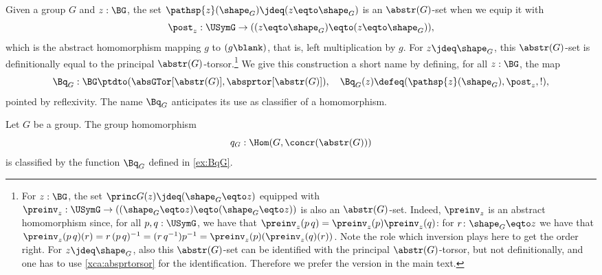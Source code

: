 \begin{example}\label{ex:BqG} 
  Given a group $G$ and $z:\BG$, 
  the set $\pathsp{z}(\sh_G)\jdeq (z\eqto\sh_G)$
  is an $\abstr(G)$-set when we equip it with
  $$\post_z:\USymG\to ((z\eqto\sh_G)\eqto (z\eqto\sh_G)),$$
  which is the abstract homomorphism mapping $g$ to $(g\blank)$,
  that is, left multiplication by $g$.
  For $z\jdeq\sh_G$, this $\abstr(G)$-set is definitionally equal
  to the principal $\abstr(G)$-torsor.\footnote{\label{ft:shG=z}%
  For $z:\BG$,
  the set $\princ G(z)\jdeq (\sh_G\eqto z)$ equipped with
  $\preinv_z:\USymG\to ((\sh_G\eqto z)\eqto (\sh_G\eqto z))$
  is also an $\abstr(G)$-set.
  Indeed, $\preinv_z$ is an abstract homomorphism since,
  for all $p,q:\USymG$, we have that 
  $\preinv_z(p\,q)=\preinv_z(p)\preinv_z(q)$: 
  for $r\colon \sh_G\eqto z$ we have that
  $\preinv_z(p\, q)(r)=r\,(p\,q)^{-1}=(r\,q^{-1}) p^{-1}=
  \preinv_z(p)(\preinv_z(q)(r))$. Note the role which inversion
  plays here to get the order right.
  For $z\jdeq\sh_G$, also this $\abstr(G)$-set can be identified
  with the principal $\abstr(G)$-torsor, but not definitionally,
  and one has to use \cref{xca:absprtorsor} for the identification.
  Therefore we prefer the version in the main text.} 
  We give this construction a short name by defining, for all $z:\BG$, the map
  \[
  \Bq_G:\BG\ptdto (\absGTor[\abstr(G)],\absprtor[\abstr(G)]),\quad \Bq_G(z)
  \defeq(\pathsp{z}(\sh_G),\post_z,!),
  \]
  pointed by reflexivity. 
  The name $\Bq_G$ anticipates its use as classifier of a homomorphism.
\end{example}

\begin{definition}\label{def:qG-concr-abstr}
  Let $G$ be a group.
  The group homomorphism
  $$q_G:\Hom(G,\concr(\abstr(G)))$$
  is classified by the function $\Bq_G$ defined in \cref{ex:BqG}.
\end{definition}

